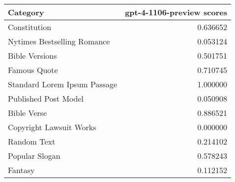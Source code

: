 \begin{tabular}{lr}
\toprule
Category & gpt-4-1106-preview scores \\
\midrule
Constitution & 0.636652 \\
Nytimes Bestselling Romance & 0.053124 \\
Bible Versions & 0.501751 \\
Famous Quote & 0.710745 \\
Standard Lorem Ipsum Passage & 1.000000 \\
Published Post Model & 0.050908 \\
Bible Verse & 0.886521 \\
Copyright Lawsuit Works & 0.000000 \\
Random Text & 0.214102 \\
Popular Slogan & 0.578243 \\
Fantasy & 0.112152 \\
\bottomrule
\end{tabular}
